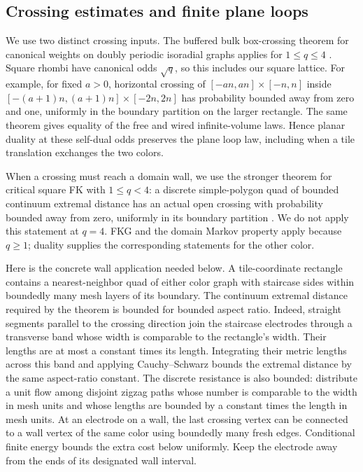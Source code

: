 \subsection{Crossing estimates and finite plane loops}

We use two distinct crossing inputs. The buffered bulk box-crossing theorem
for canonical weights on doubly periodic isoradial graphs applies for
$1\le q\le4$ \citep[Theorem~1.1]{DCLM2019Isoradial}. Square rhombi have
canonical odds $\sqrt q$, so this includes our square lattice. For example,
for fixed $a>0$, horizontal crossing of
$[-an,an]\times[-n,n]$ inside
$[-(a+1)n,(a+1)n]\times[-2n,2n]$ has probability bounded away from zero
and one, uniformly in the boundary partition on the larger rectangle.
The same theorem gives equality of the free and wired infinite-volume
laws. Hence planar duality at these self-dual odds preserves the plane
loop law, including when a tile translation exchanges the two colors.

When a crossing must reach a domain wall, we use the stronger theorem for
critical square FK with $1\le q<4$: a discrete simple-polygon quad of
bounded continuum extremal distance has an actual open crossing with
probability bounded away from zero, uniformly in its boundary partition
\citep[Theorem~1.2]{DMT2021Fractal}. We do not apply this statement at $q=4$.
FKG and the domain Markov property apply because $q\ge1$; duality supplies
the corresponding statements for the other color.

Here is the concrete wall application needed below. A tile-coordinate
rectangle contains a nearest-neighbor quad of either color graph with
staircase sides within boundedly many mesh layers of its boundary.
The continuum extremal distance required by the theorem is bounded for
bounded aspect ratio. Indeed, straight segments parallel to the crossing
direction join the staircase electrodes through a transverse band whose
width is comparable to the rectangle's width. Their lengths are at most
a constant times its length. Integrating their metric lengths across
this band and applying Cauchy--Schwarz bounds the extremal distance by
the same aspect-ratio constant. The discrete resistance is also bounded:
distribute a unit flow among disjoint zigzag paths whose number is
comparable to the width in mesh units and whose lengths are bounded by
a constant times the length in mesh units. At an electrode on a wall,
the last crossing vertex can
be connected to a wall vertex of the same color using boundedly many fresh
edges. Conditional finite energy bounds the extra cost below uniformly.
Keep the electrode away from the ends of its designated wall interval.


